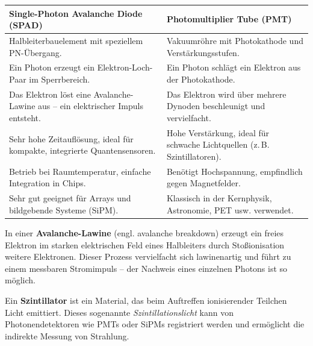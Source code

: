 \begin{tcolorbox}[hinweisbox, title=Didaktischer Vergleich: SPAD vs. PMT]
	\label{box:vergleich SPAD}
	\small
	\begin{tabular}{p{} | p{}}
		\textbf{Single-Photon Avalanche Diode (SPAD)} & \textbf{Photomultiplier Tube (PMT)} \\
		\hline
		Halbleiterbauelement mit speziellem PN-Übergang\index{PN-Übergang}. & Vakuumröhre\index{Vakuumröhre} mit Photokathode und Verstärkungsstufen. \\
		\hline
		Ein Photon erzeugt ein Elektron-Loch-Paar\index{Elektron-Loch-Paar} im Sperrbereich\index{Sperrbereich}. & Ein Photon schlägt ein Elektron aus der Photokathode. \\
		\hline
		Das Elektron löst eine Avalanche-Lawine\index{Avalanche-Lawine} aus – ein elektrischer Impuls entsteht. & Das Elektron wird über mehrere Dynoden beschleunigt und vervielfacht. \\
		\hline
		Sehr hohe Zeitauflösung\index{Zeitauflösung}, ideal für kompakte, integrierte Quantensensoren\index{Quantensensor}. & Hohe Verstärkung, ideal für schwache Lichtquellen (z.\,B. Szintillatoren\index{Szintillator}). \\
		\hline
		Betrieb bei Raumtemperatur\index{Raumtemperatur}, einfache Integration in Chips\index{Chip}. & Benötigt Hochspannung, empfindlich gegen Magnetfelder. \\
		\hline
		Sehr gut geeignet für Arrays und bildgebende Systeme (SiPM). & Klassisch in der Kernphysik\index{Kernphysik}, Astronomie, PET\index{Positronen-Emissions-Tomographie} usw. verwendet. \\
	\end{tabular}
\end{tcolorbox}
\begin{tcolorbox}[didaktikbox, title=Begriffserklärung: Avalanche-Lawine]
	\label{box:avalanche}
	\small
	In einer \textbf{Avalanche-Lawine} (engl. avalanche breakdown) erzeugt ein freies Elektron im starken elektrischen Feld eines Halbleiters durch Stoßionisation weitere Elektronen. Dieser Prozess vervielfacht sich lawinenartig und führt zu einem messbaren Stromimpuls – der Nachweis eines einzelnen Photons ist so möglich.
\end{tcolorbox}
\vspace{1em}
\begin{tcolorbox}[didaktikbox, title=Begriffserklärung: Szintillator]
	\label{box:szintillator}
	\small
	Ein \textbf{Szintillator} ist ein Material, das beim Auftreffen ionisierender Teilchen Licht emittiert. Dieses sogenannte \emph{Szintillationslicht} kann von Photonendetektoren wie PMTs oder SiPMs registriert werden und ermöglicht die indirekte Messung von Strahlung.
\end{tcolorbox}

